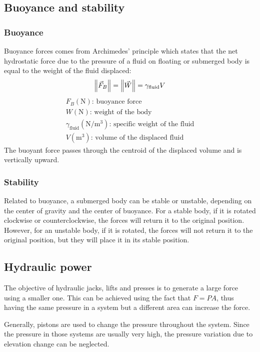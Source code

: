 \documentclass[10pt, twocolumn]{article}
\begin{document}
\subsection{Buoyance and stability}
\subsubsection*{Buoyance}
Buoyance forces comes from Archimedes' principle which states that the net hydrostatic force due to the pressure of a fluid on floating or submerged body is equal to the weight of the fluid displaced:
\[
  \left\| \vec{F}_B \right\| = \left\| \vec{W} \right\| = \gamma_\mathrm{fluid} V
\]
\[
  \begin{array}{|l}
    F_B (\si{\newton}) \text{: buoyance force}                                                 \\
    W (\si{\newton}) \text{: weight of the body}                                               \\
    \gamma_\mathrm{fluid} (\si{\newton\per\metre\cubed}) \text{: specific weight of the fluid} \\
    V (\si{\metre\cubed}) \text{: volume of the displaced fluid}
  \end{array}
\]
The buoyant force passes through the centroid of the displaced volume and is vertically upward.

\subsubsection*{Stability}
Related to buoyance, a submerged body can be stable or unstable, depending on the center of gravity and the center of buoyance.
For a stable body, if it is rotated clockwise or counterclockwise, the forces will return it to the original position.
However, for an unstable body, if it is rotated, the forces will not return it to the original position, but they will place it in its stable position.


\subsection{Hydraulic power}
The objective of hydraulic jacks, lifts and presses is to generate a large force using a smaller one.
This can be achieved using the fact that \(F = PA\), thus having the same pressure in a system but a different area can increase the force.

Generally, pistons are used to change the pressure throughout the system.
Since the pressure in those systems are usually very high, the pressure variation due to elevation change can be neglected.
\end{document}
